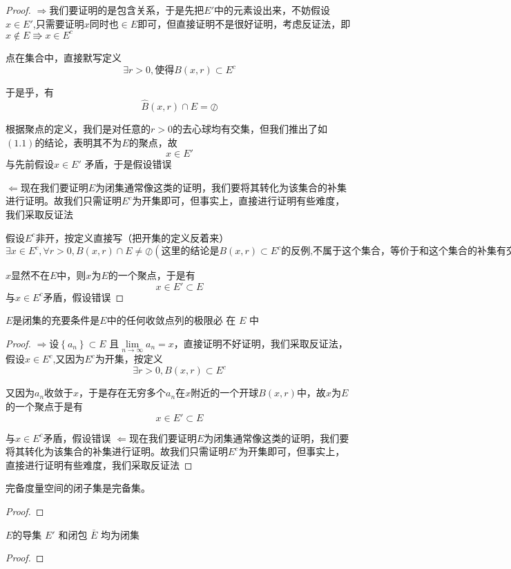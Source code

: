 \documentclass[lang=cn,10pt]{elegantbook}
\begin{document}
\begin{proof}
	
	$\Longrightarrow $我们要证明的是包含关系，于是先把$E'$中的元素设出来，不妨假设$x\in E'$,只需要证明$x\text{同时也}\in E$即可，但直接证明不是很好证明，考虑反证法，即$x\notin E\Rrightarrow x\in E^c$
	
	点在集合中，直接默写定义
	\begin{equation*}
		\exists r>0,\text{使得}  B(x,r)\subset E^c
	\end{equation*}
	
	于是乎，有
	\begin{equation}
		\hat{B}\left( x,r \right) \cap E=\oslash 
	\end{equation}
	
	根据聚点的定义，我们是对任意的$r>0$的去心球均有交集，但我们推出了如$(1.1)$的结论，表明其不为$E$的聚点，故
	\begin{equation*}
		x\in E'
	\end{equation*}
	与先前假设$x\in  E'$ 矛盾，于是假设错误
	
	$\Longleftarrow$现在我们要证明$E$为闭集通常像这类的证明，我们要将其转化为该集合的补集进行证明。故我们只需证明$E^{c}$为开集即可，但事实上，直接进行证明有些难度，我们采取反证法
	
	假设$E^{c}$非开，按定义直接写（把开集的定义反着来）
	\begin{equation*}
		\exists x \in E^{c},\forall r >0,B(x,r)\cap E\ne\oslash (\text{这里的结论是}B(x,r)\subset E^{c}\text{的反例,不属于这个集合，等价于和这个集合的补集有交集})
	\end{equation*}
	
	$x$显然不在$E$中，则$x$为$E$的一个聚点，于是有
	\begin{equation*}		
		x\in E' \subset E
	\end{equation*}
	与$x \in E^{c}$矛盾，假设错误
\end{proof}
\begin{corollary}
	$E $是闭集的充要条件是$ E $中的任何收敛点列的极限必
	在 $E$ 中
\end{corollary}
\begin{proof}
	$\Longrightarrow$设$\left\{ a_n \right\} \subset E$ 且$\underset{n\rightarrow \infty}{\lim}a_n=x$，直接证明不好证明，我们采取反证法，假设$x\in E^{c}$,又因为$E^{c}$为开集，按定义
	\begin{equation*}
		\exists r>0,B(x,r)\subset E^{c}
	\end{equation*}
	
	又因为$a_{n}$收敛于$x$，于是存在无穷多个$a_{n}$在$x$附近的一个开球$B(x,r)$中，故$x$为$E$的一个聚点于是有
	\begin{equation*}		
		x\in E' \subset E
	\end{equation*}
	
	与$x \in E^{c}$矛盾，假设错误
	$\Longleftarrow$现在我们要证明$E$为闭集通常像这类的证明，我们要将其转化为该集合的补集进行证明。故我们只需证明$E^{c}$为开集即可，但事实上，直接进行证明有些难度，我们采取反证法
\end{proof}
\begin{corollary}
	完备度量空间的闭子集是完备集。
\end{corollary}
\begin{proof}
	
\end{proof}
\begin{theorem}
	$E $的导集 $E′$ 和闭包 $\bar E$ 均为闭集
\end{theorem}
\begin{proof}
	
\end{proof}
\end{document}
